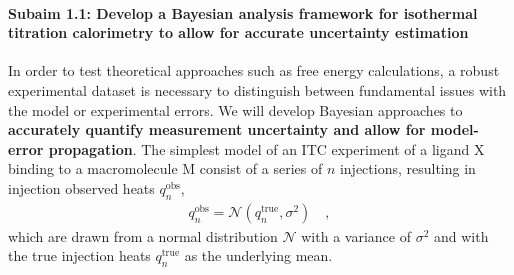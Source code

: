\documentclass[10pt,final]{article}
\newcommand{\subsubsubsection}[1]{\paragraph*{#1}}
\begin{document}
\subsubsubsection{Subaim 1.1: Develop a Bayesian analysis framework for isothermal titration calorimetry to allow for accurate uncertainty estimation}
In order to test theoretical approaches such as free energy calculations, a robust experimental dataset is necessary to distinguish between fundamental issues with the model or experimental errors.  %
We will develop Bayesian approaches to \textbf{accurately quantify measurement uncertainty and allow for model-error propagation}. 
The simplest model of an ITC experiment of a ligand $\mathrm{X}$ binding to a macromolecule $\mathrm{M}$ consist of a series of $n$ injections, resulting in injection observed heats $q_n^\mathrm{obs}$,
\begin{align}
	q_n^\mathrm{obs} = \mathcal{N}(q_n^\mathrm{true}, \sigma^2) \quad ,
\end{align}
which are drawn from a normal distribution $\mathcal{N}$ with a variance of $\sigma^2$ and with the true injection heats $q_n^\mathrm{true}$ as the underlying mean. %
\end{document}
